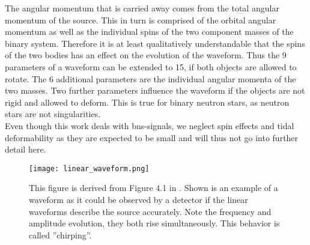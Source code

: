 The angular momentum that is carried away comes from the total angular momentum of the source. This in turn is comprised of the orbital angular momentum as well as the individual spins of the two component masses of the binary system. Therefore it is at least qualitatively understandable that the spins of the two bodies has an effect on the evolution of the waveform. Thus the 9 parameters of a waveform can be extended to 15, if both objects are allowed to rotate. The 6 additional parameters are the individual angular momenta of the two masses. Two further parameters influence the waveform if the objects are not rigid and allowed to deform. This is true for binary neutron stars, as neutron stars are not singularities.\\
Even though this work deals with \gls{bns}-signals, we neglect spin effects and tidal deformability as they are expected to be small and will thus not go into further detail here.\\%
\begin{figure}
\centering
\texttt{[image: linear\_waveform.png]}
\caption[Example time-evolution of a linear waveform]{This figure is derived from Figure 4.1 in \cite{gwv1}. Shown is an example of a waveform as it could be observed by a detector if the linear waveforms describe the source accurately. Note the frequency and amplitude evolution, they both rise simultaneously. This behavior is called ''chirping''.}\label{fig:linear_waveform}
\end{figure}

